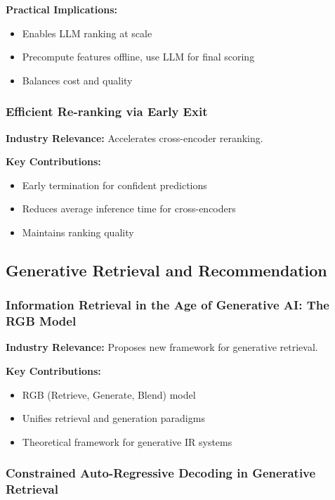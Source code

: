 \documentclass[11pt,letterpaper]{article}
\begin{document}
\textbf{Practical Implications:}
\begin{itemize}[leftmargin=*]
    \item Enables LLM ranking at scale
    \item Precompute features offline, use LLM for final scoring
    \item Balances cost and quality
\end{itemize}

\subsubsection{Efficient Re-ranking via Early Exit}

\textbf{Industry Relevance:} Accelerates cross-encoder reranking.

\textbf{Key Contributions:}
\begin{itemize}[leftmargin=*]
    \item Early termination for confident predictions
    \item Reduces average inference time for cross-encoders
    \item Maintains ranking quality
\end{itemize}

\subsection{Generative Retrieval and Recommendation}

\subsubsection{Information Retrieval in the Age of Generative AI: The RGB Model}

\textbf{Industry Relevance:} Proposes new framework for generative retrieval.

\textbf{Key Contributions:}
\begin{itemize}[leftmargin=*]
    \item RGB (Retrieve, Generate, Blend) model
    \item Unifies retrieval and generation paradigms
    \item Theoretical framework for generative IR systems
\end{itemize}

\subsubsection{Constrained Auto-Regressive Decoding in Generative Retrieval}
\end{document}

